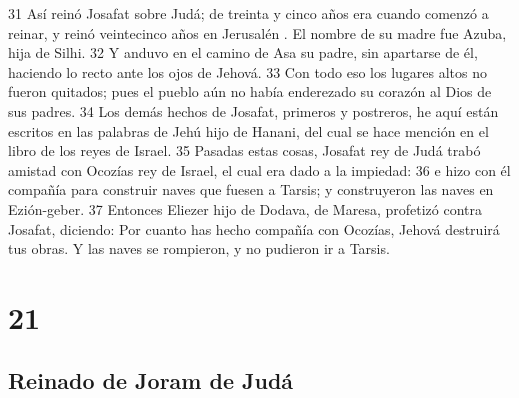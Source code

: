 31 Así reinó Josafat sobre Judá; de treinta y cinco años era cuando comenzó a reinar, y reinó veintecinco años en Jerusalén . El nombre de su madre fue Azuba, hija de Silhi.
32 Y anduvo en el camino de Asa su padre, sin apartarse de él, haciendo lo recto ante los ojos de Jehová.
33 Con todo eso los lugares altos no fueron quitados; pues el pueblo aún no había enderezado su corazón al Dios de sus padres.
34 Los demás hechos de Josafat, primeros y postreros, he aquí están escritos en las palabras de Jehú hijo de Hanani, del cual se hace mención en el libro de los reyes de Israel.
35 Pasadas estas cosas, Josafat rey de Judá trabó amistad con Ocozías rey de Israel, el cual era dado a la impiedad:
36 e hizo con él compañía para construir naves que fuesen a Tarsis; y construyeron las naves en Ezión-geber.
37 Entonces Eliezer hijo de Dodava, de Maresa, profetizó contra Josafat, diciendo: Por cuanto has hecho compañía con Ocozías, Jehová destruirá tus obras. Y las naves se rompieron, y no pudieron ir a Tarsis.

\chapter{21}

\section*{Reinado de Joram de Judá}

